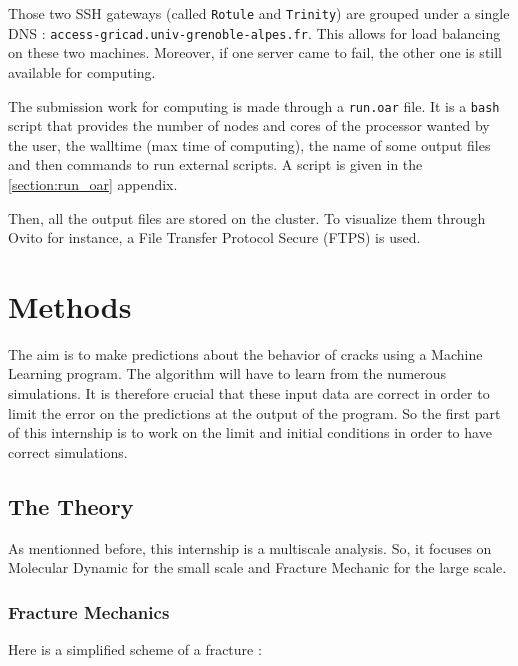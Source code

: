         Those two \gls{SSH} gateways (called \verb|Rotule| and \verb|Trinity|) are grouped under a single DNS : \verb|access-gricad.univ-grenoble-alpes.fr|. This allows for load balancing on these two machines. Moreover, if one server came to fail, the other one is still available for computing. 
        
        The submission work for computing is made through a \verb|run.oar| file. It is a \verb|bash| script that provides the number of nodes and cores of the processor wanted by the user, the walltime (max time of computing), the name of some output files and then commands to run external scripts. A script is given in the \ref{section:run_oar} appendix.

        Then, all the output files are stored on the cluster. To visualize them through Ovito for instance, a File Transfer Protocol Secure (FTPS) is used. 


\section{Methods}

    The aim is to make predictions about the behavior of cracks using a Machine Learning program. The algorithm will have to learn from the numerous simulations. It is therefore crucial that these input data are correct in order to limit the error on the predictions at the output of the program. So the first part of this internship is to work on the limit and initial conditions in order to have correct simulations.

    \subsection{The Theory}

        As mentionned before, this internship is a multiscale analysis. So, it focuses on Molecular Dynamic for the small scale and Fracture Mechanic for the large scale. \medskip

        \subsubsection{Fracture Mechanics}
            Here is a simplified scheme of a fracture : 
                \begin{center}
                    \captionsetup{type=figure}
                \end{center}
            
